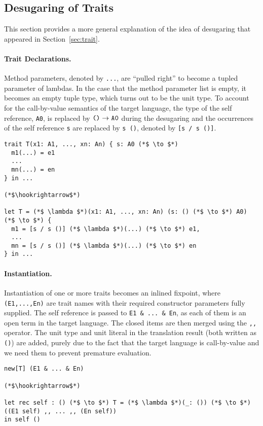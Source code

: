\subsection{Desugaring of Traits}

This section provides a more general explanation of the idea of desugaring that
appeared in Section~\ref{sec:trait}.

\paragraph{Trait Declarations.} Method parameters, denoted by \lstinline$...$,
are ``pulled right'' to become a tupled parameter of lambdas. In the case that
the method parameter list is empty, it becomes an empty tuple type, which turns
out to be the unit type. To account for the call-by-value semantics of the
target language, the type of the self reference, \lstinline$A0$, is replaced by
$\texttt{()} \to \texttt{A0}$ during the desugaring and the occurrences of the self
reference \lstinline$s$ are replaced by \lstinline$s ()$, denoted by
\lstinline$[s / s ()]$.

\begin{lstlisting}
trait T(x1: A1, ..., xn: An) { s: A0 (*$ \to $*)
  m1(...) = e1
  ...
  mn(...) = en
} in ...

(*$\hookrightarrow$*)

let T = (*$ \lambda $*)(x1: A1, ..., xn: An) (s: () (*$ \to $*) A0) (*$ \to $*) {
  m1 = [s / s ()] (*$ \lambda $*)(...) (*$ \to $*) e1,
  ...
  mn = [s / s ()] (*$ \lambda $*)(...) (*$ \to $*) en
} in ...
\end{lstlisting}

\paragraph{Instantiation.} Instantiation of one or more traits becomes an
inlined fixpoint, where \lstinline$(E1,...,En)$ are trait names with their
required constructor parameters fully supplied. The self reference is passed to
\lstinline$E1 & ... & En$, as each of them is an open term in the target
language. The closed items are then merged using the \lstinline$,,$ operator.
The unit type and unit literal in the translation result (both written as
\lstinline$()$) are added, purely due to the fact that the target language is
call-by-value and we need them to prevent premature evaluation.

\begin{lstlisting}
new[T] (E1 & ... & En)

(*$\hookrightarrow$*)

let rec self : () (*$ \to $*) T = (*$ \lambda $*)(_: ()) (*$ \to $*) ((E1 self) ,, ... ,, (En self))
in self ()
\end{lstlisting}
